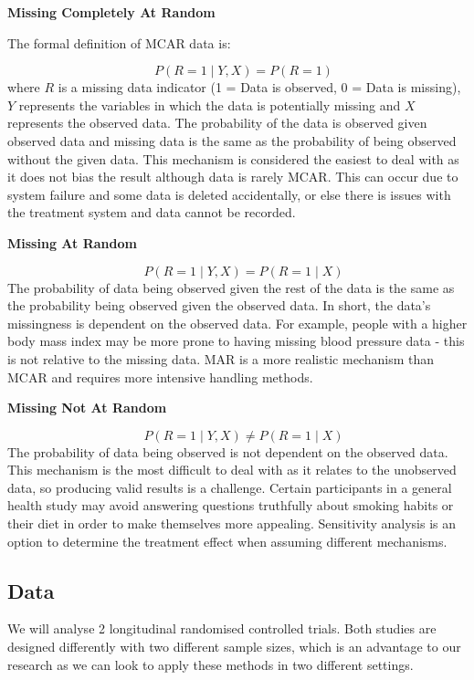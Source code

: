 \documentclass{article}
\begin{document}
\textbf{Missing Completely At Random}

The formal definition of MCAR data is:

\[\quad P(R = 1 \mid Y, X) = P(R = 1)\] where \(R\) is a missing data
indicator (1 = Data is observed, 0 = Data is missing), \(Y\) represents
the variables in which the data is potentially missing and \(X\)
represents the observed data. The probability of the data is observed
given observed data and missing data is the same as the probability of
being observed without the given data. This mechanism is considered the
easiest to deal with as it does not bias the result although data is
rarely MCAR. This can occur due to system failure and some data is
deleted accidentally, or else there is issues with the treatment system
and data cannot be recorded.

\textbf{Missing At Random}

\[\quad P(R = 1 \mid Y, X) = P(R = 1 \mid X)\] The probability of data
being observed given the rest of the data is the same as the probability
being observed given the observed data. In short, the data's missingness
is dependent on the observed data. For example, people with a higher
body mass index may be more prone to having missing blood pressure data
- this is not relative to the missing data. MAR is a more realistic
mechanism than MCAR and requires more intensive handling methods.

\textbf{Missing Not At Random}

\[\quad P(R = 1 \mid Y, X) \ne P(R = 1 \mid X)\] The probability of data
being observed is not dependent on the observed data. This mechanism is
the most difficult to deal with as it relates to the unobserved data, so
producing valid results is a challenge. Certain participants in a
general health study may avoid answering questions truthfully about
smoking habits or their diet in order to make themselves more appealing.
Sensitivity analysis is an option to determine the treatment effect when
assuming different mechanisms.

\subsection{Data}\label{data}

We will analyse 2 longitudinal randomised controlled trials. Both
studies are designed differently with two different sample sizes, which
is an advantage to our research as we can look to apply these methods in
two different settings.
\end{document}
